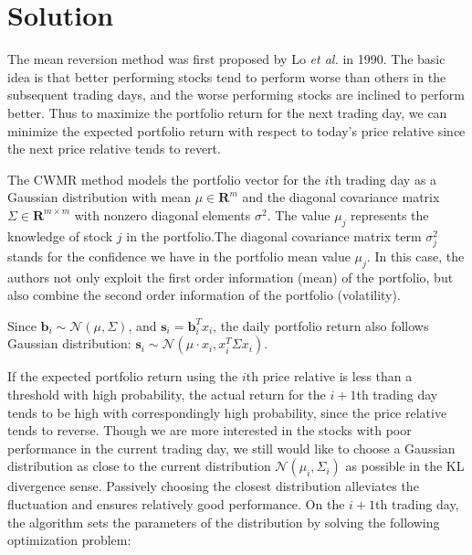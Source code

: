 \section{Solution}
The mean reversion method was first proposed by Lo \emph{et al.}\cite{mean_reverse} in 1990. The basic idea is that better performing stocks tend to perform worse than others in the subsequent trading days, and the worse performing stocks are inclined to perform better. Thus to maximize the portfolio return for the next trading day, we can minimize the expected portfolio return with respect to today's price relative since the next price relative tends to revert.  

The CWMR method models the portfolio vector for the $i$th trading day as a Gaussian distribution with mean $\mu\in \textbf{R}^m$ and the diagonal covariance matrix $\Sigma\in \textbf{R}^{m\times m}$ with nonzero diagonal elements $\sigma^2$.  The value $\mu_j$ represents the knowledge of stock $j$ in the portfolio.The diagonal covariance matrix term $\sigma_j^2$ stands for the confidence we have in the portfolio mean value $\mu_j$.  In this case, the authors not only exploit the first order information (mean) of the portfolio, but also combine the second order information of the portfolio (volatility).

Since $\textbf{b}_i \sim \mathcal{N}(\mu, \Sigma)$, and  $\textbf{s}_i = \textbf{b}_i^T x_i$, the daily portfolio return also follows Gaussian distribution: $\textbf{s}_i \sim \mathcal{N}(\mu\cdot x_i, x_i^T\Sigma x_i)$.

If the expected portfolio return using the $i$th price relative is less than a threshold with high probability, the actual return for the $i+1$th trading day tends to be high with correspondingly high probability, since the price relative tends to reverse. Though we are more interested in the stocks with poor performance in the current trading day, we still would like to choose a Gaussian distribution as close to the current distribution $\mathcal{N}(\mu_i,\Sigma_i)$ as possible in the KL divergence sense. Passively choosing the closest distribution alleviates the fluctuation and ensures relatively good performance. On the $i+1$th trading day, the algorithm sets the parameters of the distribution by solving the following optimization problem:

